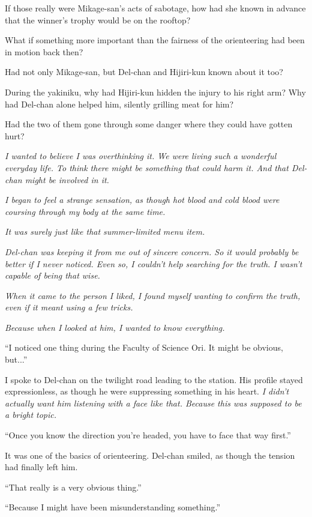 \documentclass[
    a4paper,
    12pt,
    twoside,
    openany,
    UTF8,
    fontset=windows
]{ctexbook}
\begin{document}
If those really were Mikage-san's acts of sabotage, how had she known in advance that the winner's trophy would be on the rooftop?

What if something more important than the fairness of the orienteering had been in motion back then?

Had not only Mikage-san, but Del-chan and Hijiri-kun known about it too?

During the yakiniku, why had Hijiri-kun hidden the injury to his right arm? Why had Del-chan alone helped him, silently grilling meat for him?

Had the two of them gone through some danger where they could have gotten hurt?

\textit{I wanted to believe I was overthinking it. We were living such a wonderful everyday life. To think there might be something that could harm it. And that Del-chan might be involved in it.}

\textit{I began to feel a strange sensation, as though hot blood and cold blood were coursing through my body at the same time.}

\textit{It was surely just like that summer-limited menu item.}

\textit{Del-chan was keeping it from me out of sincere concern. So it would probably be better if I never noticed. Even so, I couldn't help searching for the truth. I wasn't capable of being that wise.}

\textit{When it came to the person I liked, I found myself wanting to confirm the truth, even if it meant using a few tricks.}

\textit{Because when I looked at him, I wanted to know everything.}

``I noticed one thing during the Faculty of Science Ori. It might be obvious, but...''

I spoke to Del-chan on the twilight road leading to the station. His profile stayed expressionless, as though he were suppressing something in his heart. \textit{I didn't actually want him listening with a face like that. Because this was supposed to be a bright topic.}

``Once you know the direction you're headed, you have to face that way first.''

It was one of the basics of orienteering. Del-chan smiled, as though the tension had finally left him.

``That really is a very obvious thing.''

``Because I might have been misunderstanding something.''
\end{document}
